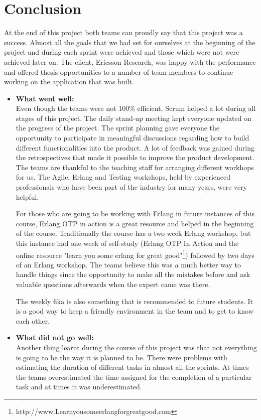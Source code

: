 \section{Conclusion}
At the end of this project both teams can proudly say that this project was a success. 
Almost all the goals that we had set for ourselves at the beginning of the project 
and during each sprint were achieved and those which were not were achieved later on. The client, Ericsson Research, was happy with the performance and 
offered thesis opportunities to a number of team members to continue working on the 
application that was built. 

\begin{itemize}
\item{\textbf{What went well:}}\\
Even though the teams were not 100\% efficient, Scrum helped a lot 
during all stages of this project. The daily stand-up meeting kept everyone updated on the 
progress of the project. The sprint planning gave everyone the opportunity 
to participate in meaningful discussions regarding how to build different functionalities into the product. A lot of feedback was gained during the retrospectives that made it possible
to improve the product development. The teams are thankful to the teaching staff for arranging different workhops for us. 
The Agile, Erlang and Testing workshops, held by experienced professionals who have been part of the 
industry for many years, were very helpful. 

For those who are going to be working with Erlang in future instances of this course, Erlang 
OTP in action is a great resource and helped in the beginning of the course. Traditionally 
the course has a two week Erlang workshop, but this instance had one week of self-study (Erlang OTP In Action and 
the online resource "learn you some erlang for great good"\footnote{http://www.Learnyousomeerlangforgreatgood.com}) 
followed by two days of an Erlang workshop. The teams believe this was a much better way to handle things since the opportunity to 
make all the mistakes before and ask valuable questions afterwards when the expert came was there. 

The weekly fika is also something that is recommended to future students. It is a 
good way to keep a friendly environment in the team and to get to know each other.     

\item{\textbf{What did not go well:}}\\ 
Another thing learnt during the course of this project was that not everything is going to be 
the way it is planned to be. There were problems with estimating the duration of different tasks in almost all 
the sprints. At times the teams overestimated the time assigned for the completion of a particular task and 
at times it was underestimated. 


\end{itemize}
